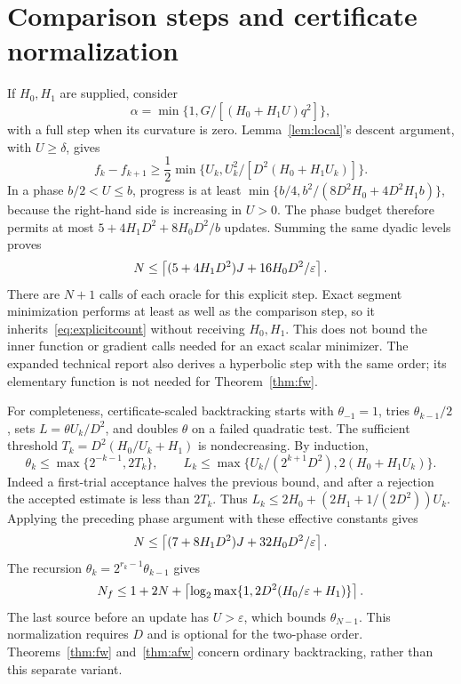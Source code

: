 \section{Comparison steps and certificate normalization}
\label{app:explicit}
If $H_0,H_1$ are supplied, consider
\[
 \alpha=\min\{1,G/[(H_0+H_1U)q^2]\},
\]
with a full step when its curvature is zero.
Lemma~\ref{lem:local}'s descent argument, with $U\ge\delta$,
gives
\[
 f_k-f_{k+1}\ge\frac12\min\{U_k,U_k^2/[D^2(H_0+H_1U_k)]\}.
\]
In a phase $b/2<U\le b$, progress is at least
$\min\{b/4,b^2/(8D^2H_0+4D^2H_1b)\}$, because the right-hand side
is increasing in $U>0$. The phase budget therefore permits at most
$5+4H_1D^2+8H_0D^2/b$ updates. Summing the same dyadic levels proves
\begin{equation}\label{eq:explicitcount}
 N\le\left\lceil(5+4H_1D^2)J+16H_0D^2/\varepsilon\right\rceil.
\end{equation}
There are $N+1$ calls of each oracle for this explicit step.
Exact segment minimization performs at least as well as the comparison
step, so it inherits~\eqref{eq:explicitcount} without receiving
$H_0,H_1$. This does not bound the inner function or gradient calls
needed for an exact scalar minimizer. The expanded technical report
also derives a hyperbolic step with the same order; its elementary
function is not needed for Theorem~\ref{thm:fw}.

For completeness, certificate-scaled backtracking starts with
$\theta_{-1}=1$, tries $\theta_{k-1}/2$, sets $L=\theta U_k/D^2$,
and doubles $\theta$ on a failed quadratic test. The sufficient
threshold $T_k=D^2(H_0/U_k+H_1)$ is nondecreasing. By induction,
\[
 \theta_k\le\max\{2^{-k-1},2T_k\},\qquad
 L_k\le\max\{U_k/(2^{k+1}D^2),2(H_0+H_1U_k)\}.
\]
Indeed a first-trial acceptance halves the previous bound, and after
a rejection the accepted estimate is less than $2T_k$.
Thus $L_k\le2H_0+(2H_1+1/(2D^2))U_k$. Applying the preceding
phase argument with these effective constants gives
\[
 N\le\left\lceil(7+8H_1D^2)J+32H_0D^2/\varepsilon\right\rceil.
\]
The recursion $\theta_k=2^{r_k-1}\theta_{k-1}$ gives
\[
 N_f\le1+2N+\left\lceil\log_2\max\{1,2D^2(H_0/\varepsilon+H_1)\}\right\rceil.
\]
The last source before an update has $U>\varepsilon$, which bounds
$\theta_{N-1}$. This normalization requires $D$ and is optional for
the two-phase order. Theorems~\ref{thm:fw} and~\ref{thm:afw} concern
ordinary backtracking, rather than this separate variant.

